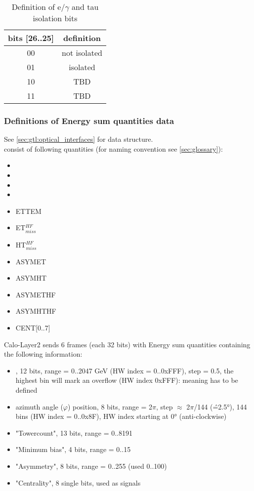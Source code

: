 \begin{table}[ht]
\caption{Definition of e/$\gamma$ and tau isolation bits}
\vspace{5mm}
\centering
\begin{tabular}{|c|c|}\hline
bits [26..25] & definition \\\hline\hline
00 & not isolated \\
01 & isolated \\
10 & TBD \\
11 & TBD \\\hline
\end{tabular}
\label{tab:gtl:eg_tau_iso_bits}
\end{table}

\clearpage

\subsubsection{Definitions of Energy sum quantities data}

See \ref{sec:gtl:optical_interfaces} for data structure.\\
{\Esums} consist of following quantities (for naming convention see \ref{sec:glossary}):
\begin{itemize}
\item {\ett}
\item {\htt}
\item {\etm}
\item {\htm}
\item {ETTEM}
\item {ET$_{miss}^{HF}$}
\item {HT$_{miss}^{HF}$}
\item {ASYMET}
\item {ASYMHT}
\item {ASYMETHF}
\item {ASYMHTHF}
\item {CENT[0..7]}
\end{itemize}

Calo-Layer2 sends 6 frames (each 32 bits) with Energy sum quantities containing the following information:
\begin{itemize}
\item \et, 12 bits, range = 0..2047 GeV (HW index = 0..0xFFF), step = 0.5, the highest bin will mark an overflow (HW index 0xFFF): meaning has to be defined
\item azimuth angle ($\varphi$) position, 8 bits, range = 2$\pi$, step $\approx$ 2$\pi$/144 (\^=2.5°), 144 bins (HW index = 0..0x8F), HW index starting at 0° (anti-clockwise)
\item "Towercount", 13 bits, range = 0..8191
\item "Minimum bias", 4 bits, range = 0..15
\item "Asymmetry", 8 bits, range = 0..255 (used 0..100)
\item "Centrality", 8 single bits, used as signals
\end{itemize}

